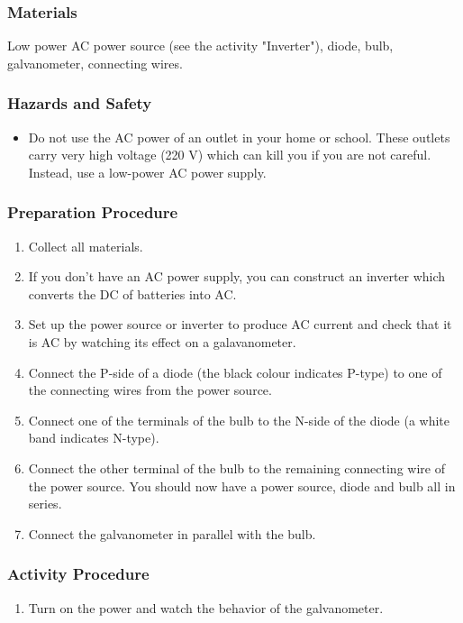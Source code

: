 \subsubsection*{Materials}
Low power AC power source (see the activity "Inverter"), diode, bulb, galvanometer, connecting wires.

\subsubsection*{Hazards and Safety}
\begin{itemize}
\item{Do not use the AC power of an outlet in your home or school.  These outlets carry very high voltage (220 V) which can kill you if you are not careful.  Instead, use a low-power AC power supply.}
\end{itemize}

\subsubsection*{Preparation Procedure}
\begin{enumerate}
\item{Collect all materials.}
\item{If you don't have an AC power supply, you can construct an inverter which converts the DC of batteries into AC.}
\item{Set up the power source or inverter to produce AC current and check that it is AC by watching its effect on a galavanometer.}
\item{Connect the P-side of a diode (the black colour indicates P-type) to one of the connecting wires from the power source.}
\item{Connect one of the terminals of the bulb to the N-side of the diode (a white band indicates N-type).}
\item{Connect the other terminal of the bulb to the remaining connecting wire of the power source.  You should now have a power source, diode and bulb all in series.}
\item{Connect the galvanometer in parallel with the bulb.}
\end{enumerate}

\subsubsection*{Activity Procedure}
\begin{enumerate}
\item{Turn on the power and watch the behavior of the galvanometer.}
\end{enumerate}

